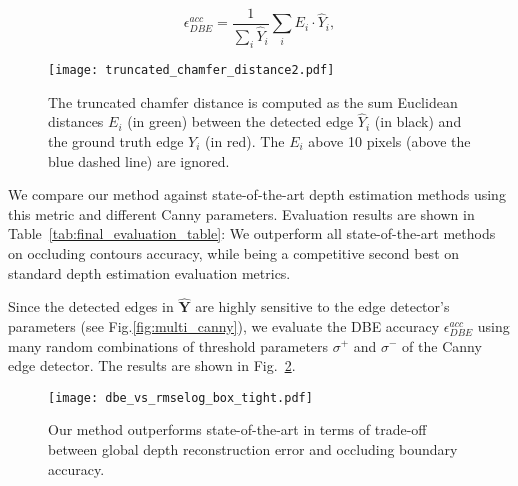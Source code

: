 \documentclass[10pt,twocolumn,letterpaper]{article}
\begin{document}
\begin{equation}
\epsilon^{acc}_{DBE} = \dfrac{1}{\sum\limits_i 
	\widehat{Y}_i}\sum_i E_i \cdot 
\widehat{Y}_i, 
\label{eq:dbe_accuracy}   
\end{equation}

\begin{figure}[t]		
	\begin{center}
		\texttt{[image: truncated\_chamfer\_distance2.pdf]}
	\end{center}	
	\caption{The truncated chamfer distance is computed as the sum Euclidean distances $E_i$ (in green) between the detected 
	edge $\widehat{Y}_i$ (in black) and the ground truth edge $Y_i$ (in 
	red). The $E_i$ above 10 pixels (above the blue dashed line) are ignored.}
	\label{fig:dbe_acc_computation}
\end{figure}

We compare our method against state-of-the-art depth estimation methods using 
this metric and different Canny parameters. Evaluation results are shown in 
Table~\ref{tab:final_evaluation_table}: We outperform all state-of-the-art 
methods on occluding contours accuracy, while being a 
competitive second best on standard depth estimation evaluation 
metrics.

Since the detected edges in $\boldsymbol{\widehat{Y}}$ are highly 
sensitive to the edge detector's parameters (see Fig.\ref{fig:multi_canny}), 
we evaluate the DBE accuracy $\epsilon_{DBE}^{acc}$ using many 
random combinations of threshold parameters $\sigma^{+}$ and $\sigma^{-}$ of the
Canny edge detector. The results are shown in Fig.~\ref{fig:compare_trade_off}.

\begin{figure}[t]	
	\begin{center}		
		\texttt{[image: dbe\_vs\_rmselog\_box\_tight.pdf]}
	\end{center}
	\caption{
	Our method outperforms state-of-the-art in terms of trade-off between 
	global depth reconstruction error and occluding boundary accuracy.
	} 
	\label{fig:compare_trade_off}
\end{figure}
\end{document}
